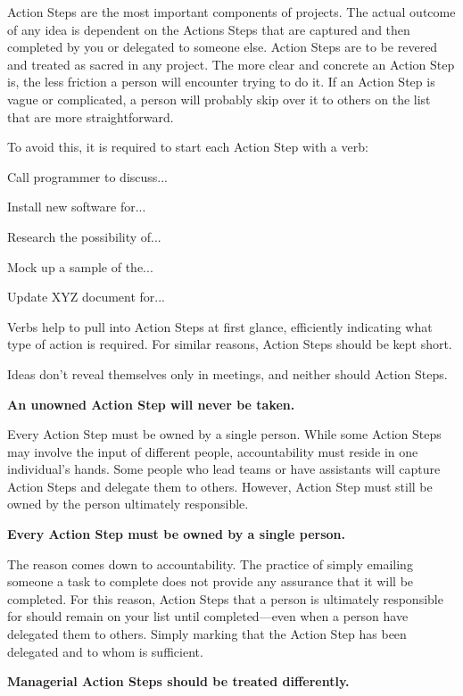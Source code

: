 Action Steps are the most important components of projects. The actual outcome of any idea is dependent on the Actions Steps that are captured and then completed by you or delegated to someone else. Action Steps are to be revered and treated as sacred in any project. The more clear and concrete an Action Step is, the less friction a person will encounter trying to do it. If an Action Step is vague or complicated, a person will probably skip over it to others on the list that are more straightforward.

To avoid this, it is required to start each Action Step with a verb:
\begin{compactitem}
   \item Call programmer to discuss...
   \item Install new software for...
   \item Research the possibility of...
   \item Mock up a sample of the...
   \item Update XYZ document for...
\end{compactitem}

Verbs help to pull into Action Steps at first glance, efficiently indicating what type of action is required. For similar reasons, Action Steps should be kept short.

Ideas don’t reveal themselves only in meetings, and neither should Action Steps.

\textbf{An unowned Action Step will never be taken.}

Every Action Step must be owned by a single person. While some Action Steps may involve the input of different people, accountability must reside in one individual’s hands. Some people who lead teams or have assistants will capture Action Steps and delegate them to others. However, Action Step must still be owned by the person ultimately responsible.

\textbf{Every Action Step must be owned by a single person.}

The reason comes down to accountability. The practice of simply emailing someone a task to complete does not provide any assurance that it will be completed. For this reason, Action Steps that a person is ultimately responsible for should remain on your list until completed—even when a person have delegated them to others. Simply marking that the Action Step has been delegated and to whom is sufficient.

\textbf{Managerial Action Steps should be treated differently.}

